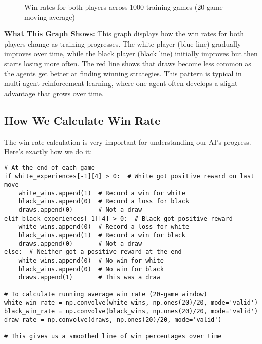 \documentclass[11pt]{article}
\begin{document}
\begin{figure}[ht]
    \caption{Win rates for both players across 1000 training games (20-game moving average)}
    \label{fig:win_rates}
\end{figure}

\textbf{What This Graph Shows:} This graph displays how the win rates for both players change as training progresses. The white player (blue line) gradually improves over time, while the black player (black line) initially improves but then starts losing more often. The red line shows that draws become less common as the agents get better at finding winning strategies. This pattern is typical in multi-agent reinforcement learning, where one agent often develops a slight advantage that grows over time.

\subsection{How We Calculate Win Rate}

The win rate calculation is very important for understanding our AI's progress. Here's exactly how we do it:

\begin{tcolorbox}[colback=yellow!5!white,colframe=yellow!75!black,title=Calculating Win Rates]
\begin{lstlisting}[style=Python]
# At the end of each game
if white_experiences[-1][4] > 0:  # White got positive reward on last move
    white_wins.append(1)  # Record a win for white
    black_wins.append(0)  # Record a loss for black
    draws.append(0)       # Not a draw
elif black_experiences[-1][4] > 0:  # Black got positive reward
    white_wins.append(0)  # Record a loss for white
    black_wins.append(1)  # Record a win for black
    draws.append(0)       # Not a draw
else:  # Neither got a positive reward at the end
    white_wins.append(0)  # No win for white
    black_wins.append(0)  # No win for black
    draws.append(1)       # This was a draw

# To calculate running average win rate (20-game window)
white_win_rate = np.convolve(white_wins, np.ones(20)/20, mode='valid')
black_win_rate = np.convolve(black_wins, np.ones(20)/20, mode='valid')
draw_rate = np.convolve(draws, np.ones(20)/20, mode='valid')

# This gives us a smoothed line of win percentages over time
\end{lstlisting}
\end{tcolorbox}


\end{document}
\end{tikzpicture}
\end{figure}
\end{document}
